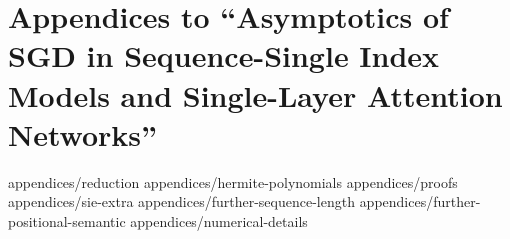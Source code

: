 \chapter[SGD in Single-Layer Attention Networks]{Appendices to ``Asymptotics of SGD in Sequence-Single Index
Models and Single-Layer Attention Networks''}
\label{chap:appendix-2506}

{appendices/reduction}
{appendices/hermite-polynomials}
{appendices/proofs}
{appendices/sie-extra}
{appendices/further-sequence-length}
{appendices/further-positional-semantic}
{appendices/numerical-details}
